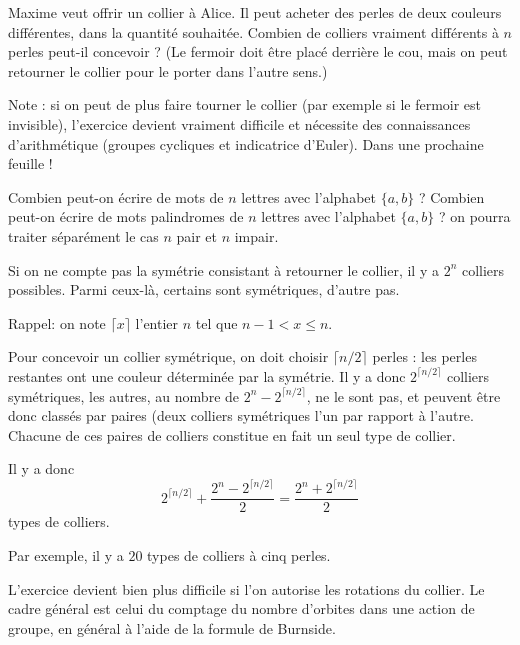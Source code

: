 \begin{exo}
Maxime veut offrir un collier à Alice. Il peut acheter des perles de deux couleurs différentes, dans la quantité souhaitée. Combien de colliers vraiment différents à $n$ perles peut-il concevoir ? (Le fermoir doit être placé derrière le cou, mais on peut retourner le collier pour le porter \og dans l'autre sens\fg.)


Note : si on peut de plus faire \og tourner\fg{} le collier (par exemple si le fermoir est invisible), l'exercice devient vraiment difficile et nécessite des connaissances d'arithmétique (groupes cycliques et indicatrice d'Euler). Dans une prochaine feuille !

\begin{hint} %
Combien peut-on écrire de mots de $n$ lettres avec l'alphabet $\{a,b\}$ ? Combien peut-on écrire de mots palindromes de $n$ lettres avec l'alphabet $\{a,b\}$ ? on pourra traiter séparément le cas $n$ pair et $n$ impair.
\end{hint} 

\begin{sol} %
Si on ne compte pas la symétrie consistant à retourner le collier, il y a $2^n$ colliers possibles. Parmi ceux-là, certains sont symétriques, d'autre pas.

Rappel: on note $\lceil x \rceil$ l'entier $n$ tel que $n-1<x \le n$.

Pour concevoir un collier symétrique, on doit choisir $\lceil n/2 \rceil$ perles : les perles restantes ont une couleur déterminée par la symétrie. Il y a donc $2^{\lceil n/2 \rceil}$ colliers symétriques, les autres, au nombre de $2^n - 2^{\lceil n/2 \rceil}$, ne le sont pas, et peuvent être donc classés par paires (deux colliers symétriques l'un par rapport à l'autre. Chacune de ces paires de colliers constitue en fait un seul \og type\fg{} de collier.

Il y a donc 
\[ 2^{\lceil n/2 \rceil} + \frac{2^n-2^{\lceil n/2 \rceil}}{2} = \frac{2^n+2^{\lceil n/2 \rceil}}{2}\]
types de colliers.

Par exemple, il y a $20$ types de colliers à cinq perles.

L'exercice devient bien plus difficile si l'on autorise les rotations du collier. Le cadre général est celui du comptage du nombre d'orbites dans une action de groupe, en général à l'aide de la formule de Burnside.
\end{sol}
\end{exo}

